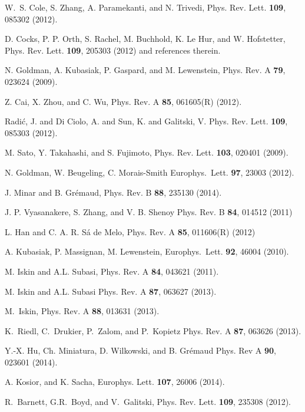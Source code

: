 \documentclass[aps,pra,showpacs,twocolumn,superscriptaddress]{revtex4-1}
\begin{document}
\begin{thebibliography}{11}
 W.~S. Cole, S. Zhang, A. Paramekanti, 
and N. Trivedi, Phys. Rev. Lett. \textbf{109},  085302  (2012).
  
 D. Cocks, P. P. Orth, S. Rachel, M. Buchhold, K. Le Hur, and W. Hofstetter,
                       Phys. Rev. Lett. \textbf{109}, 205303 (2012) and references therein.
  
 N. Goldman, A. Kubasiak, P. Gaspard, and M. Lewenstein,   Phys. Rev. A \textbf{79}, 023624 (2009).

  Z. Cai, X. Zhou, and C. Wu, Phys. Rev. A \textbf{85}, 061605(R) (2012).

 Radi\'{c}, J. and Di Ciolo, A. and Sun, K. and Galitski, V.
                       Phys. Rev. Lett. \textbf{109}, 085303 (2012).

 M. Sato, Y. Takahashi, and S. Fujimoto, Phys. Rev. Lett. \textbf{103}, 020401 (2009).

 N. Goldman, W. Beugeling, C. Morais-Smith Europhys.~Lett. \textbf{97},  23003 (2012).

 J. Minar and B. Grémaud, Phys. Rev. B \textbf{88},
  235130 (2014).

 J. P. Vyasanakere, S. Zhang, and V. B. Shenoy  Phys. Rev. B \textbf{84}, 014512 (2011) 

 L. Han and C. A. R. S\'a de Melo,  Phys. Rev. A \textbf{85}, 011606(R) (2012)

 A. Kubasiak, P. Massignan, M. Lewenstein, Europhys.~Lett. \textbf{92}, 46004 (2010).

 M. Iskin and A.L. Subasi, Phys. Rev. A \textbf{84}, 043621 (2011).

 M. Iskin and A.L. Subasi  Phys. Rev. A \textbf{87}, 063627 (2013).

 M.~Iskin, Phys. Rev. A \textbf{88}, 013631 (2013).

 K.~Riedl, C.~Drukier, P.~Zalom, and P.~Kopietz Phys. Rev. A \textbf{87}, 063626 (2013).

 Y.-X. Hu, Ch. Miniatura, D. Wilkowski, and
  B. Grémaud Phys. Rev A \textbf{90}, 023601 (2014).
  
 A. Kosior, and K. Sacha, Europhys. Lett. \textbf{107}, 26006 (2014).

 R.~Barnett, G.R.~Boyd, and V.~Galitski,
  Phys. Rev. Lett. \textbf{109}, 235308 (2012).
  

\end{thebibliography}
\end{document}
